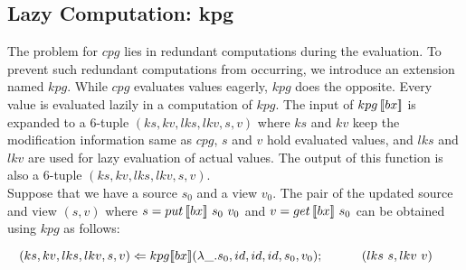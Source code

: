 



\subsection{Lazy Computation: kpg}

The problem for $cpg$ lies in redundant computations during the evaluation. To prevent such redundant computations from occurring, we introduce an extension named $kpg$. While $cpg$ evaluates values eagerly, $kpg$ does the opposite. Every value is evaluated lazily in a computation of $kpg$. The input of $kpg \, [\![bx]\!]$ is expanded to a 6-tuple $(ks, kv, lks, lkv, s, v)$ where $ks$ and $kv$ keep the modification information same as $cpg$, $s$ and $v$ hold evaluated values, and $lks$ and $lkv$ are used for lazy evaluation of actual values. The output of this function is also a 6-tuple $(ks, kv, lks, lkv, s, v)$.\\
Suppose that we have a source $s_0$ and a view $v_0$. The pair of the updated source and view $(s, v)$ where $s = put \, [\![bx]\!] \ s_0 \ v_0$ and $v = get \, [\![bx]\!] \ s_0$ can be obtained using $kpg$ as follows:

\smallvspace
    $\tab (ks, kv, lks, lkv, s, v) \Leftarrow \kpg{bx}{\lambda \_.s_0}{id}{id}{id}{s_0}{v_0};\\
        \tab \qtab (lks \ s, lkv \ v)$
\smallvspace
        
